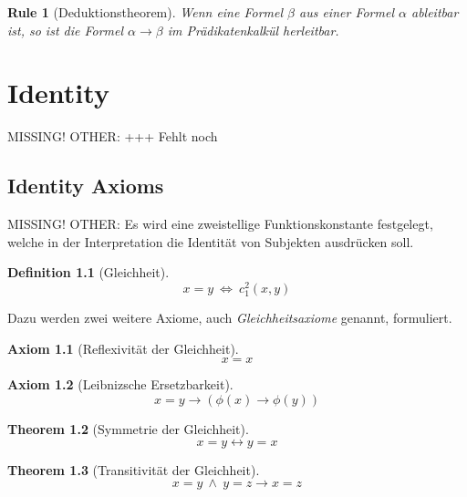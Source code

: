 \documentclass[a4paper,german,10pt,twoside]{book}
\newtheorem{thm}{Theorem}[chapter]
\newtheorem{ax}{Axiom}
\newtheorem{rul}{Rule}
\theoremstyle{definition}
\newtheorem{defn}[thm]{Definition}
\theoremstyle{remark}
\begin{document}
\begin{rul}[Deduktionstheorem]
Wenn eine Formel $\beta$ aus einer Formel $\alpha$ ableitbar ist, so ist die Formel $\alpha \rightarrow
\beta$ im Pr{\"a}dikatenkalk{\"u}l herleitbar.
\end{rul}



\chapter{Identity} \label{chapter6} \hypertarget{chapter6}{}

MISSING! OTHER: +++ Fehlt noch

\section{Identity Axioms} \label{chapter6_section0} \hypertarget{chapter6_section0}{}
MISSING! OTHER: \hypertarget{gleichheit}{}
Es wird eine zweistellige Funktionskonstante festgelegt, welche in der Interpretation die Identit{\"a}t
von Subjekten ausdr{\"u}cken soll.
\begin{defn}[Gleichheit]
$$x = y \ \Leftrightarrow \ c_1^2(x, y)$$
\end{defn}

Dazu werden zwei weitere Axiome, auch
\emph{Gleichheitsaxiome} genannt, formuliert.
\begin{ax}[Reflexivit{\"a}t der Gleichheit]
$$x = x$$
\end{ax}

\begin{ax}[Leibnizsche Ersetzbarkeit]\hypertarget{leibniz}{}
$$x = y  \rightarrow (\phi(x) \rightarrow \phi(y))$$
\end{ax}

\begin{thm}[Symmetrie der Gleichheit]
\begin{equation}
x = y \leftrightarrow y = x
\end{equation}
\end{thm}

\begin{thm}[Transitivit{\"a}t der Gleichheit]
\begin{equation}
x = y ~ \land ~ y = z \rightarrow x = z
\end{equation}
\end{thm}
\end{document}

